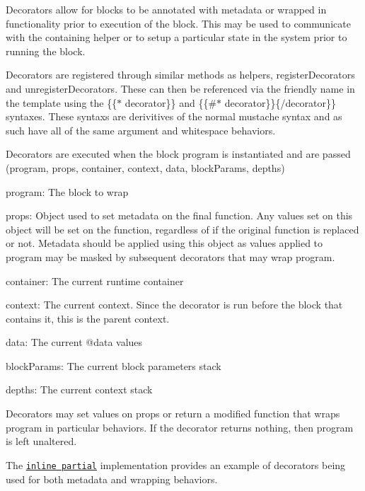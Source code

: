 Decorators allow for blocks to be annotated with metadata or wrapped in functionality prior to execution of the block. This may be used to communicate with the containing helper or to setup a particular state in the system prior to running the block.

Decorators are registered through similar methods as helpers, {\ttfamily register\+Decorators} and {\ttfamily unregister\+Decorators}. These can then be referenced via the friendly name in the template using the {\ttfamily \{\{$\ast$ decorator\}\}} and {\ttfamily \{\{\#$\ast$ decorator\}\}\{/decorator\}\}} syntaxes. These syntaxs are derivitives of the normal mustache syntax and as such have all of the same argument and whitespace behaviors.

Decorators are executed when the block program is instantiated and are passed {\ttfamily (program, props, container, context, data, block\+Params, depths)}


\begin{DoxyItemize}
\item {\ttfamily program}\+: The block to wrap
\item {\ttfamily props}\+: Object used to set metadata on the final function. Any values set on this object will be set on the function, regardless of if the original function is replaced or not. Metadata should be applied using this object as values applied to {\ttfamily program} may be masked by subsequent decorators that may wrap {\ttfamily program}.
\item {\ttfamily container}\+: The current runtime container
\item {\ttfamily context}\+: The current context. Since the decorator is run before the block that contains it, this is the parent context.
\item {\ttfamily data}\+: The current {\ttfamily @data} values
\item {\ttfamily block\+Params}\+: The current block parameters stack
\item {\ttfamily depths}\+: The current context stack
\end{DoxyItemize}

Decorators may set values on {\ttfamily props} or return a modified function that wraps {\ttfamily program} in particular behaviors. If the decorator returns nothing, then {\ttfamily program} is left unaltered.

The \href{https://github.com/wycats/handlebars.js/blob/master/lib/handlebars/decorators/inline.js}{\tt inline partial} implementation provides an example of decorators being used for both metadata and wrapping behaviors. 